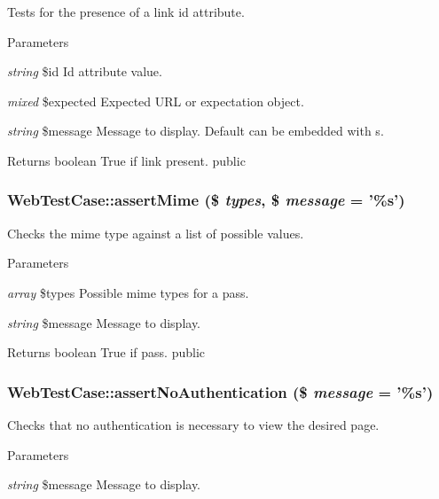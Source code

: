 \label{class_web_test_case_ab2edabae7160d6b9646de3c366b7c640}
Tests for the presence of a link id attribute. 
\begin{DoxyParams}{Parameters}
\item[{\em string}]\$id Id attribute value. \item[{\em mixed}]\$expected Expected URL or expectation object. \item[{\em string}]\$message Message to display. Default can be embedded with s. \end{DoxyParams}
\begin{DoxyReturn}{Returns}
boolean True if link present.  public 
\end{DoxyReturn}
\hypertarget{class_web_test_case_ad3447866f2462d2efd18e70657ff19ee}{
\subsubsection[{assertMime}]{\setlength{\rightskip}{0pt plus 5cm}WebTestCase::assertMime (\$ {\em types}, \/  \$ {\em message} = {\ttfamily '\%s'})}}
\label{class_web_test_case_ad3447866f2462d2efd18e70657ff19ee}
Checks the mime type against a list of possible values. 
\begin{DoxyParams}{Parameters}
\item[{\em array}]\$types Possible mime types for a pass. \item[{\em string}]\$message Message to display. \end{DoxyParams}
\begin{DoxyReturn}{Returns}
boolean True if pass.  public 
\end{DoxyReturn}
\hypertarget{class_web_test_case_aa3d977b11d4cd690ad1644b0103de9d1}{
\subsubsection[{assertNoAuthentication}]{\setlength{\rightskip}{0pt plus 5cm}WebTestCase::assertNoAuthentication (\$ {\em message} = {\ttfamily '\%s'})}}
\label{class_web_test_case_aa3d977b11d4cd690ad1644b0103de9d1}
Checks that no authentication is necessary to view the desired page. 
\begin{DoxyParams}{Parameters}
\item[{\em string}]\$message Message to display. \end{DoxyParams}
